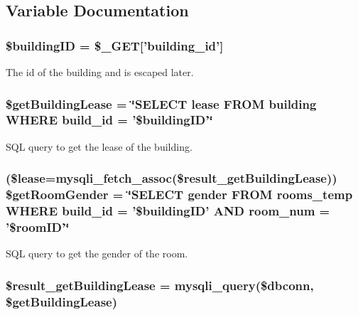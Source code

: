 \subsection{\-Variable \-Documentation}
\hypertarget{getRoomInfo_8php_acfaa0ff73c631ce07c4851ed12fcd83d}{
\subsubsection[{\$building\-I\-D}]{\setlength{\rightskip}{0pt plus 5cm}\$building\-I\-D = \$\-\_\-\-G\-E\-T\mbox{[}'building\-\_\-id'\mbox{]}}}\label{getRoomInfo_8php_acfaa0ff73c631ce07c4851ed12fcd83d}
\-The id of the building and is escaped later. \hypertarget{getRoomInfo_8php_aabf2e51b7b4dbb02c653d458b96fcd32}{
\subsubsection[{\$get\-Building\-Lease}]{\setlength{\rightskip}{0pt plus 5cm}\$get\-Building\-Lease = \char`\"{}\-S\-E\-L\-E\-C\-T lease \-F\-R\-O\-M building \-W\-H\-E\-R\-E build\-\_\-id = '\$building\-I\-D'\char`\"{}}}\label{getRoomInfo_8php_aabf2e51b7b4dbb02c653d458b96fcd32}
\-S\-Q\-L query to get the lease of the building. \hypertarget{getRoomInfo_8php_a65a823b86bd329b8545e10df6a4bc325}{
\subsubsection[{\$get\-Room\-Gender}]{ (\$lease=mysqli\-\_\-fetch\-\_\-assoc(\$result\-\_\-get\-Building\-Lease)) \$get\-Room\-Gender = \char`\"{}\-S\-E\-L\-E\-C\-T gender \-F\-R\-O\-M rooms\-\_\-temp \-W\-H\-E\-R\-E build\-\_\-id = '\$building\-I\-D' \-A\-N\-D room\-\_\-num = '\$room\-I\-D'\char`\"{}}}\label{getRoomInfo_8php_a65a823b86bd329b8545e10df6a4bc325}
\-S\-Q\-L query to get the gender of the room. \hypertarget{getRoomInfo_8php_a85b7461a0b78e5b681f1c7c5c6b4654c}{
\subsubsection[{\$result\-\_\-get\-Building\-Lease}]{\setlength{\rightskip}{0pt plus 5cm}\$result\-\_\-get\-Building\-Lease = mysqli\-\_\-query(\$dbconn, \$get\-Building\-Lease)}}\label{getRoomInfo_8php_a85b7461a0b78e5b681f1c7c5c6b4654c}
